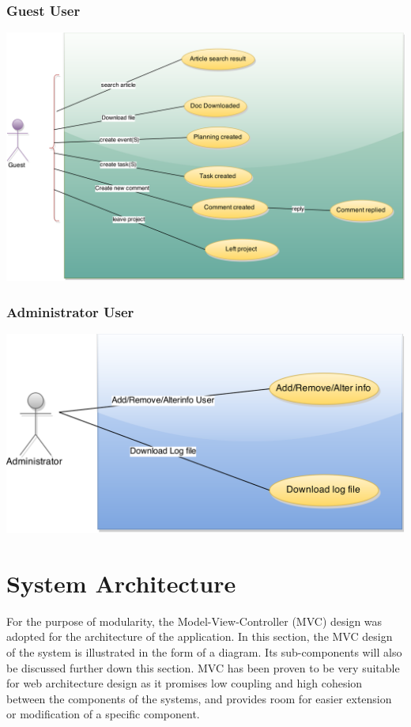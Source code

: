 \subsubsection{Guest User} 
\begin{center}
\includegraphics[scale=0.3]{./img/dsgn_img/USECASE4.png}
	
\end{center}

\subsubsection{Administrator User} 
\begin{center}
\includegraphics[scale=0.3]{./img/dsgn_img/USECASE3.png}
	
\end{center}

\newpage
\section{System Architecture} %
\label{sec:system_architecture}
For the purpose of modularity, the Model-View-Controller (MVC) design was adopted for the architecture of the application. In this section, the MVC design of the system is illustrated in the form of a diagram. Its sub-components will also be discussed further down this section. MVC has been proven to be very suitable for web architecture design as it promises low coupling and high cohesion between the components of the systems, and provides room for easier extension or modification of a specific component.
